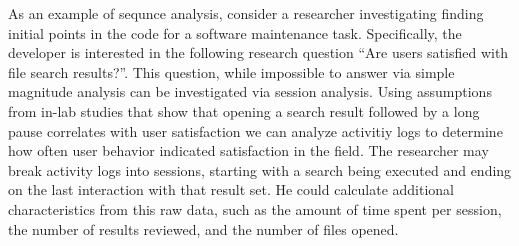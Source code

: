 As an example of sequnce analysis, consider a researcher investigating finding initial points in the code for a software maintenance task. Specifically, the developer is interested in the following research question ``Are users satisfied with file search results?''. This question, while impossible to answer via simple magnitude analysis can be investigated via session analysis. Using assumptions from in-lab studies that show that opening a search result followed by a long pause correlates with user satisfaction we can analyze activitiy logs to determine how often user behavior indicated satisfaction in the field. The researcher may break activity logs into sessions, starting with a search being executed and ending on the last interaction with that result set. He could calculate additional characteristics from this raw data, such as the amount of time spent per session, the number of results reviewed, and the number of files opened.   




